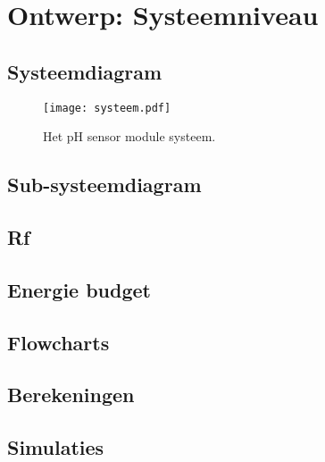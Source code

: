 \section{Ontwerp: Systeemniveau}
\subsection{Systeemdiagram}
\begin{figure}[ht]
    \centering
    \texttt{[image: systeem.pdf]}
    \caption[short]{Het pH sensor module systeem.}
    \label{fig:functional}
\end{figure}
\subsection{Sub-systeemdiagram }%


\subsection{Rf}

\subsection{Energie budget}

\subsection{Flowcharts}
\subsection{Berekeningen}
\subsection{Simulaties}




%

